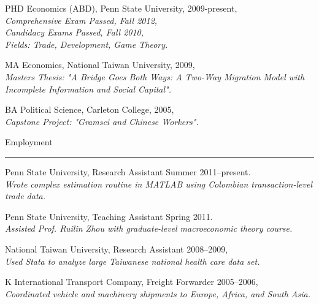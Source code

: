\documentclass[letterpaper]{article}
\renewenvironment{itemize}{
    \begin{list}{}{
            \setlength{\leftmargin}{1.5em}
        }
    }{
    \end{list}
}
\begin{document}
\begin{itemize}
    \item PHD Economics (ABD), Penn State University, 2009-present,\\
        \hspace*{1cm}\emph{Comprehensive Exam Passed, Fall 2012,}\\
        \hspace*{1cm}\emph{Candidacy Exams Passed, Fall 2010,}\\
        \hspace*{1cm}\emph{Fields: Trade, Development, Game Theory.}


    \item MA Economics, National Taiwan University, 2009,\\
        \hspace*{1cm}\emph{Masters Thesis: "A Bridge Goes Both Ways: A Two-Way Migration Model with Incomplete Information \hspace*{1cm}and Social Capital".}

    \item BA Political Science, Carleton College, 2005,\\
        \hspace*{1cm}\emph{Capstone Project: "Gramsci and Chinese Workers".}
\end{itemize}

\vspace{4mm}
{\Large Employment}
\hrule

\begin{itemize}
    \item Penn State University, Research Assistant Summer 2011--present.\\
        \hspace*{1cm}\emph{Wrote complex estimation routine in MATLAB using Colombian transaction-level trade data.}
    \item Penn State University, Teaching Assistant Spring 2011.\\
        \hspace*{1cm}\emph{Assisted Prof. Ruilin Zhou with graduate-level macroeconomic theory course.}
    \item National Taiwan University, Research Assistant 2008--2009,\\
        \hspace*{1cm}\emph{Used Stata to analyze large Taiwanese national health care data set.}
    \item K International Transport Company, Freight Forwarder 2005--2006,\\
        \hspace*{1cm}\emph{Coordinated vehicle and machinery shipments to Europe, Africa, and South Asia.} 
\end{itemize}
\end{document}
